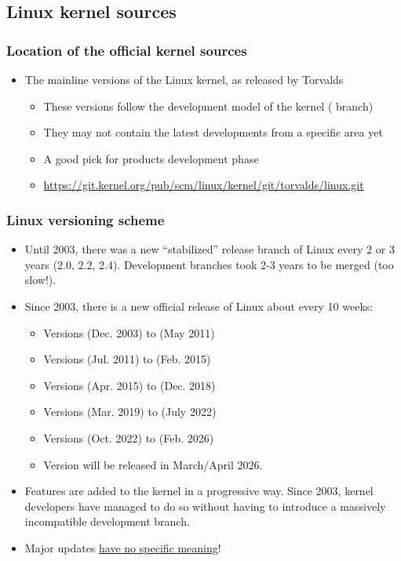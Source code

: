 \subsection{Linux kernel sources}

\begin{frame}
  \frametitle{Location of the official kernel sources}
  \begin{itemize}
  \item The mainline versions of the Linux kernel, as released by Torvalds
    \begin{itemize}
    \item These versions follow the development model of the kernel
          ( branch)
    \item They may not contain the latest developments from a specific
      area yet
    \item A good pick for products development phase
    \item \url{https://git.kernel.org/pub/scm/linux/kernel/git/torvalds/linux.git}
    \end{itemize}
  \end{itemize}
\end{frame}

\begin{frame}
  \frametitle{Linux versioning scheme}
  \begin{itemize}
  \item Until 2003, there was a new ``stabilized'' release branch of Linux every
        2 or 3 years (2.0, 2.2, 2.4). Development branches took 2-3
        years to be merged (too slow!).
  \item Since 2003, there is a new official release of Linux about every
	10 weeks:
  \begin{itemize}
	\item Versions  (Dec. 2003) to  (May 2011)
	\item Versions  (Jul. 2011) to  (Feb. 2015)
	\item Versions  (Apr. 2015) to  (Dec. 2018)
	\item Versions  (Mar. 2019) to  (July 2022)
	\item Versions  (Oct. 2022) to  (Feb. 2026)
	\item Version  will be released in March/April 2026.
  \end{itemize}
  \item Features are added to the kernel in a progressive way. Since
        2003, kernel developers have managed to do so without having
        to introduce a massively incompatible development branch.
  \item Major updates \href{https://lore.kernel.org/lkml/CAHk-=wiiRA_XxoF96Q_1n4BadBGJLRkHarHG92u3aTc+1ZMeGQ@mail.gmail.com/}{have no specific meaning}! \\
  \end{itemize}
\end{frame}

